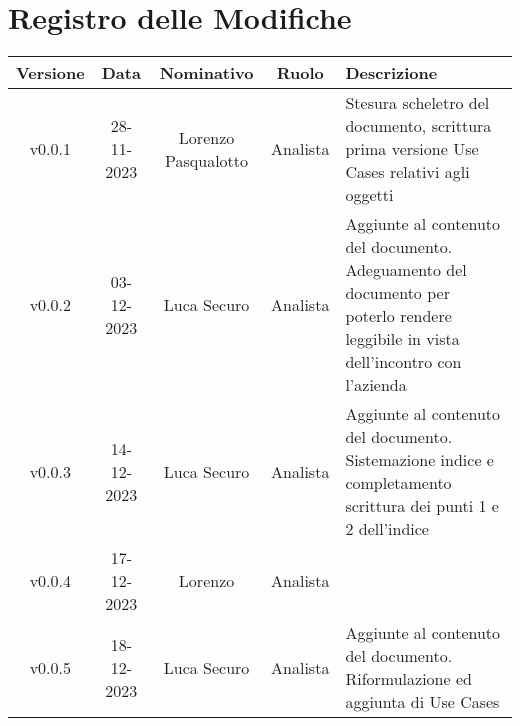 \section*{\Large Registro delle Modifiche}
    \begin{table}[h]
        \centering
        \renewcommand\tabularxcolumn[1]{m{#1}} %
        \renewcommand{\arraystretch}{1.5}
        \begin{tabularx}{0.98\textwidth}
            {c|c|c|c|>{\centering\arraybackslash}X}
            \rowcolor{black}
            \textbf{\color{white} Versione} & \textbf{\color{white} Data} & \textbf{\color{white} Nominativo} & \textbf{\color{white} Ruolo} & \textbf{\color{white} Descrizione} \\ 
            \hline

            v0.0.1 & 28-11-2023 & Lorenzo Pasqualotto & Analista & Stesura scheletro del documento, scrittura prima versione Use Cases relativi agli oggetti \\
            v0.0.2 & 03-12-2023 & Luca Securo & Analista & Aggiunte al contenuto del documento. Adeguamento del documento per poterlo rendere leggibile in vista dell'incontro con l'azienda \\
            v0.0.3 & 14-12-2023 & Luca Securo & Analista & Aggiunte al contenuto del documento. Sistemazione indice e completamento scrittura dei punti 1 e 2 dell'indice\\
            v0.0.4 & 17-12-2023 & Lorenzo & Analista & \\
            v0.0.5 & 18-12-2023 & Luca Securo & Analista & Aggiunte al contenuto del documento. Riformulazione ed aggiunta di Use Cases\\

            \hline
        \end{tabularx}
    \end{table}